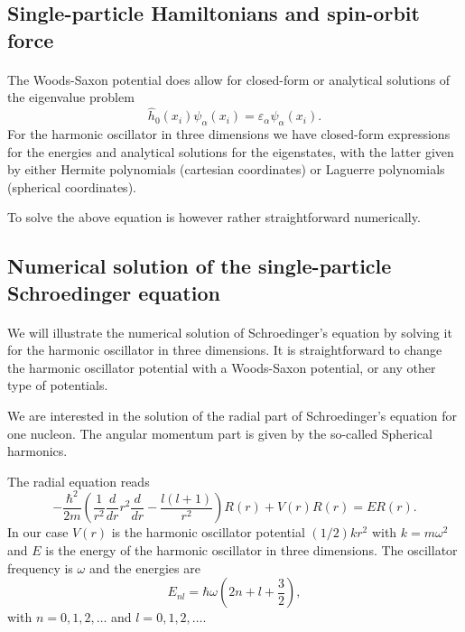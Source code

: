 \documentclass[%
twoside,                 %
final,                   %
10pt]{article}
\begin{document}
\subsection*{Single-particle Hamiltonians and spin-orbit force}

\paragraph{}
The Woods-Saxon potential does allow for closed-form or analytical solutions of the eigenvalue problem
\[
  \hat{h}_0(x_i)\psi_{\alpha}(x_i)=\varepsilon_{\alpha}\psi_{\alpha}(x_i).  
\]
For the harmonic oscillator in three dimensions we have closed-form expressions for the energies and analytical solutions for the eigenstates,
with the latter given by either Hermite polynomials (cartesian coordinates) or Laguerre polynomials (spherical coordinates).

To solve the above equation is however rather straightforward numerically.



\subsection*{Numerical solution of the single-particle Schroedinger equation}

\paragraph{}
We will illustrate the numerical solution of Schroedinger's equation by solving it for the harmonic oscillator in three dimensions.
It is straightforward to change the harmonic oscillator potential with a Woods-Saxon potential, or any other type of potentials. 

We are interested in the solution of the radial part of Schroedinger's equation for one nucleon. 
The angular momentum part  is given by the so-called Spherical harmonics. 

The radial equation reads
\[
  -\frac{\hbar^2}{2 m} \left ( \frac{1}{r^2} \frac{d}{dr} r^2
  \frac{d}{dr} - \frac{l (l + 1)}{r^2} \right )R(r) 
     + V(r) R(r) = E R(r).
\]
In our case $V(r)$ is the harmonic oscillator potential $(1/2)kr^2$ with
$k=m\omega^2$ and $E$ is
the energy of the harmonic oscillator in three dimensions.
The oscillator frequency is $\omega$ and the energies are
\[
E_{nl}=  \hbar \omega \left(2n+l+\frac{3}{2}\right),
\]
with $n=0,1,2,\dots$ and $l=0,1,2,\dots$.
\end{document}
